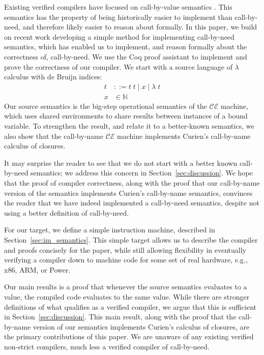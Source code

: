 Existing verified compilers have focused on call-by-value semantics
\cite{chlipala2007certified, leroy2012compcert, cakeml14}. This semantics has
the property of being historically easier to implement than call-by-need, and
therefore likely easier to reason about formally. In this paper, we build on
recent work developing a simple method for implementing call-by-need semantics,
which has enabled us to implement, and reason formally about the correctness of,
call-by-need. We use the Coq proof assistant \cite{barras1997coq} to implement
and prove the correctness of our compiler. We start with a source language of
$\lambda$ calculus with de Bruijn indices:
\begin{align*}
 t &::= t \; t \; | \; x \; | \;  \lambda \; t \\
 x &\in \mathbb{N}
\end{align*}
Our source semantics is the big-step operational semantics of the $\mathcal{CE}$
machine, which uses shared environments to share results between instances of a
bound variable. To strengthen the result, and relate it to a better-known
semantics, we also show that the call-by-name $\mathcal{CE}$ machine implements
Curien's call-by-name calculus of closures. 

It may surprise the reader to see that we do not start with a better known
call-by-need semantics; we address this concern in
Section~\ref{sec:discussion}.  We hope that the proof of compiler correctness,
along with the proof that our call-by-name version of the semantics implements
Curien's call-by-name semantics, convinces the reader that we have indeed
implemented a call-by-need semantics, despite not using a better definition of
call-by-need. 

For our target, we define a simple instruction machine, described in
Section~\ref{sec:im_semantics}. This simple target allows us to describe the
compiler and proofs concisely for the paper, while still allowing
flexibility in eventually verifying a compiler down to machine code for some
set of real hardware, e.g., x86, ARM, or Power. 

Our main results is a proof that whenever the source semantics evaluates to a
value, the compiled code evaluates to the same value. While there are stronger
definitions of what qualifies as a verified compiler, we argue that this is
sufficient in Section~\ref{sec:discussion}. This main result, along with the
proof that the call-by-name version of our semantics implements Curien's
calculus of closures, are the primary contributions of this paper. We are
unaware of any existing verified non-strict compilers, much less a verified
compiler of call-by-need. 

